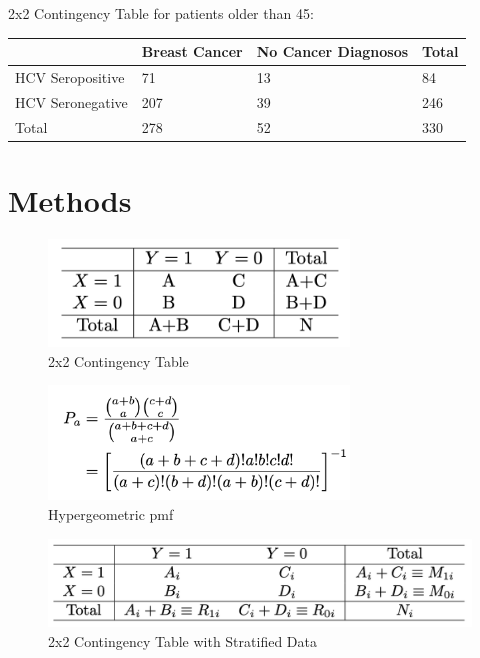 \documentclass[12pt, titlepage]{article}
\begin{document}
\vspace{1cm}

2x2 Contingency Table for patients older than 45:

\begin{tabular}{ | m{4cm} | m{4cm}| m{4cm} | m{2cm} | }
  \hline
    & Breast Cancer & No Cancer Diagnosos & Total\\ 
  \hline
  HCV Seropositive & 71 & 13 & 84 \\ 
  \hline
  HCV Seronegative & 207 & 39 & 246 \\ 
  \hline
  Total & 278 & 52 & 330 \\ 
  \hline
\end{tabular}


\section{Methods}
\label{sec:methods}

\begin{figure}[tbp]
  \centering
  \includegraphics[width=8cm]{table.png}
  \caption{2x2 Contingency Table}
  \label{fig:table}
\end{figure}

\begin{figure}[tbp]
  \centering
  \includegraphics[width=8cm]{formula.png}
  \caption{Hypergeometric pmf}
  \label{fig:formula}
\end{figure}

\begin{figure}[tbp]
  \centering
  \includegraphics[width=12cm]{2x2 stratified table.png}
  \caption{2x2 Contingency Table with Stratified Data}
  \label{fig:strat}
\end{figure}
\end{document}
